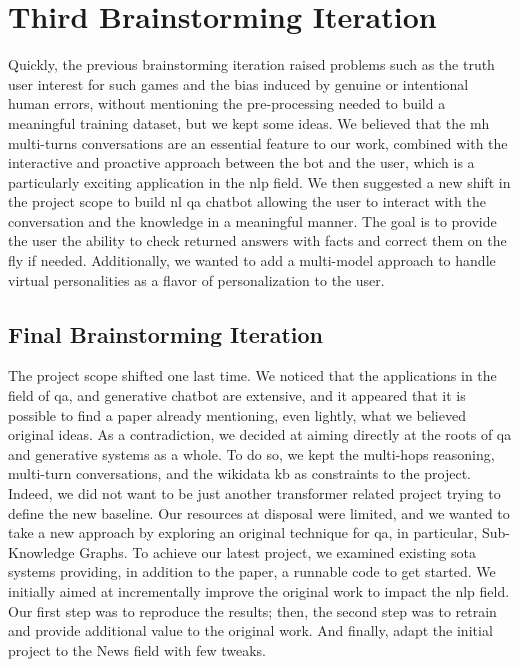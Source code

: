 \section{Third Brainstorming Iteration}
Quickly, the previous brainstorming iteration raised problems such as the truth user interest for such games and the bias induced by genuine or intentional human errors, without mentioning the pre-processing needed to build a meaningful training dataset, but we kept some ideas. We believed that the \gls{mh} multi-turns conversations are an essential feature to our work, combined with the interactive and proactive approach between the bot and the user, which is a particularly exciting application in the \gls{nlp} field. We then suggested a new shift in the project scope to build \gls{nl} \gls{qa} chatbot allowing the user to interact with the conversation and the knowledge in a meaningful manner. The goal is to provide the user the ability to check returned answers with facts and correct them on the fly if needed. Additionally, we wanted to add a multi-model approach to handle virtual personalities as a flavor of personalization to the user.


\subsection{Final Brainstorming Iteration}
The project scope shifted one last time. We noticed that the applications in the field of \gls{qa}, and \gls{generative} chatbot are extensive, and it appeared that it is possible to find a paper already mentioning, even lightly, what we believed original ideas. As a contradiction, we decided at aiming directly at the roots of \gls{qa} and \gls{generative} systems as a whole. To do so, we kept the multi-hops reasoning, multi-turn conversations, and the \gls{wikidata} \gls{kb} as constraints to the project. Indeed, we did not want to be just another \gls{transformer} related project trying to define the new baseline. Our resources at disposal were limited, and we wanted to take a new approach by exploring an original technique for \gls{qa}, in particular, Sub-Knowledge Graphs. To achieve our latest project, we examined existing \gls{sota} systems providing, in addition to the paper, a runnable code to get started. We initially aimed at incrementally improve the original work to impact the \gls{nlp} field. Our first step was to reproduce the results; then, the second step was to retrain and provide additional value to the original work. And finally, adapt the initial project to the News field with few tweaks. 

